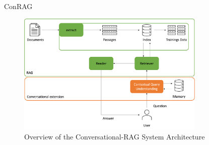 \documentclass{beamer}
\begin{document}
\begin{frame}{ConRAG}

  \vfill
  \begin{figure}
    \includegraphics[width=0.8\textwidth]{Grafiken/System_Architecture.png}
    \caption{Overview of the Conversational-RAG System Architecture}
  \end{figure}
  \vfill

\end{frame}
\end{document}
